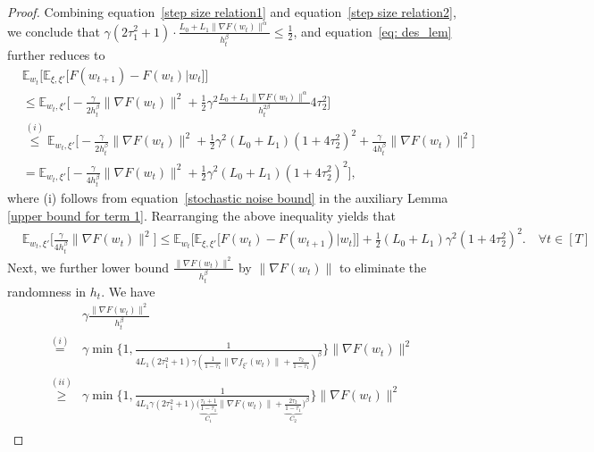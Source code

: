 \documentclass[10pt]{article} %
\def\eqref#1{equation~\ref{#1}}
\newtheorem{proof}{Proof}
\begin{document}
\begin{proof}
Combining \eqref{step size relation1} and \eqref{step size relation2}, we conclude that $\gamma(2\tau_1^2+1)\cdot \frac{L_0+L_1 \|\nabla F(w_t) \|^{\alpha}}{h_t^{\beta}}\le \frac{1}{2}$, and \eqref{eq: des_lem} further reduces to 
\begin{align}
    &\mathbb{E}_{w_t}\Big[\mathbb{E}_{\xi, \xi'}\big[F(w_{t+1})-F(w_t)|w_t \big]\Big] \nonumber\\
    & \overset{}{\leq} \mathbb{E}_{w_t, \xi'}\Big[-\frac{\gamma}{2h_t^{\beta}}\big \|\nabla F(w_t) \big \|^2 + \frac{1}{2}\gamma^2 \frac{L_0+L_1 \big \|\nabla F(w_t) \big \|^{\alpha}}{h_t^{2\beta}}{4\tau_2^2}\Big] \nonumber\\
    & \overset{(i)}{\leq} \mathbb{E}_{w_t, \xi'}\Big[ -\frac{\gamma}{2h_t^{\beta}}\big \|\nabla F(w_t) \big \|^2 + \frac{1}{2}\gamma^2 (L_0+L_1) (1+4\tau_2^2)^2+\frac{\gamma}{4h_t^{\beta}}\big \|\nabla F(w_t) \big \|^2 \Big] \nonumber\\
    & = \mathbb{E}_{w_t, \xi'}\Big[ -\frac{\gamma}{4h_t^{\beta}}\big \|\nabla F(w_t) \big \|^2 + \frac{1}{2}\gamma^2 (L_0+L_1) (1+4\tau_2^2)^2 \Big],
    \label{refined descent lemma}
\end{align}
where (i) follows from \eqref{stochastic noise bound} in the auxiliary Lemma \ref{upper bound for term 1}.
Rearranging the above inequality yields that
\begin{align}
   &\mathbb{E}_{w_t, \xi'}\Big[ \frac{\gamma}{4h_t^{\beta}} \big \|\nabla F(w_t) \big \|^2 \Big] \leq \mathbb{E}_{w_t}\Big[\mathbb{E}_{\xi, \xi'
    }\big[F(w_t) - F(w_{t+1})|w_t \big]\Big] + \frac{1}{2}(L_0+L_1 )\gamma^2(1+4\tau_2^2)^2. \quad \forall t \in [T]
    \label{for telescope sum}
\end{align}
Next, we further lower bound $ \frac{ \| \nabla F(w_t) \|^2}{h_t^{\beta}} $ by $\| \nabla F(w_t)\|$ to eliminate the randomness in $h_t$. We have
\begin{align}
    &\gamma\frac{ \big \| \nabla F(w_t) \big \|^2}{h_t^{\beta}} \nonumber\\
    \overset{(i)}{=}&\gamma \min \Big\{1,\frac{1}{4L_1(2\tau_1^2+1)\gamma(\frac{1}{1-\tau_1}\big \|\nabla f_{\xi'}(w_t) \big \|+\frac{\tau_2}{1-\tau_1})^\beta}  \Big \} \big \|\nabla F(w_t) \big \|^2 \nonumber \\
    \overset{(ii)}{\geq}& \gamma \min \Big\{1,\frac{1}{4L_1\gamma(2\tau_1^2+1)\big(\underbrace{\frac{\tau_1+1}{1-\tau_1}}_{C_1}\big \|\nabla F(w_t) \big \|+\underbrace{\frac{2\tau_2}{1-\tau_1}}_{C_2} \big)^{\beta}}  \Big \} \big \|\nabla F(w_t) \big \|^2 \nonumber \\

\end{align}
\end{proof}
\end{document}
